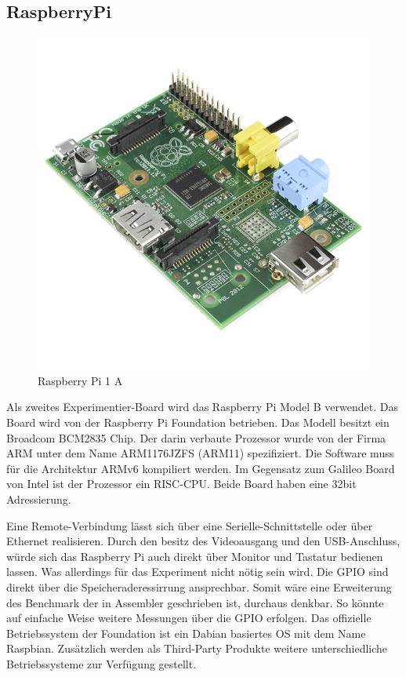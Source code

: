 \subsection{RaspberryPi}


\begin{figure}
\centering
\includegraphics[scale=0.4]{images/raspberry-pi-2.png}
\caption{Raspberry Pi 1 A\cite{raspberry_image}}
\label{fig:Raspberry Pi 1 A}
\end{figure}


Als zweites Experimentier-Board wird das Raspberry Pi Model B\cite{raspberry_foundation} verwendet. Das Board wird von der Raspberry Pi Foundation betrieben. Das Modell besitzt ein Broadcom BCM2835\cite{broadcom_datasheet} Chip. Der darin verbaute Prozessor wurde von der Firma ARM unter dem Name ARM1176JZFS\cite{arm_datasheet} (ARM11) spezifiziert. Die Software muss für die Architektur ARMv6 kompiliert werden. Im Gegensatz zum Galileo Board von Intel ist der Prozessor ein RISC-CPU. Beide Board haben eine 32bit Adressierung.
\par
Eine Remote-Verbindung lässt sich über eine Serielle-Schnittstelle oder über Ethernet realisieren. Durch den besitz des Videoausgang und den USB-Anschluss, würde sich das Raspberry Pi auch direkt über Monitor und Tastatur bedienen lassen. Was allerdings für das Experiment nicht nötig sein wird. Die GPIO sind direkt über die Speicheraderessirrung ansprechbar. Somit wäre eine Erweiterung des Benchmark der in Assembler geschrieben ist, durchaus denkbar. So könnte auf einfache Weise weitere Messungen über die GPIO erfolgen. Das offizielle Betriebssystem der Foundation ist ein Dabian basiertes OS mit dem Name Raspbian. Zusätzlich werden als Third-Party Produkte weitere unterschiedliche Betriebssysteme zur Verfügung gestellt. 












